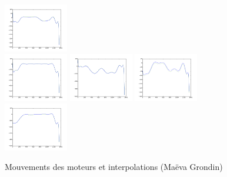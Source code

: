 \documentclass{beamer}
\begin{document}
\begin{frame}
\begin{figure}
		\includegraphics[width=0.25\textwidth]{images/graph/motor8.png}~\\
		\includegraphics[width=0.25\textwidth]{images/graph/motor9.png}
		\includegraphics[width=0.25\textwidth]{images/graph/motor10.png}
		\includegraphics[width=0.25\textwidth]{images/graph/motor11.png}
		\includegraphics[width=0.25\textwidth]{images/graph/motor12.png}
		\caption{Mouvements des moteurs et interpolations (Maëva Grondin)}
	\end{figure}
\end{frame}
\end{document}
